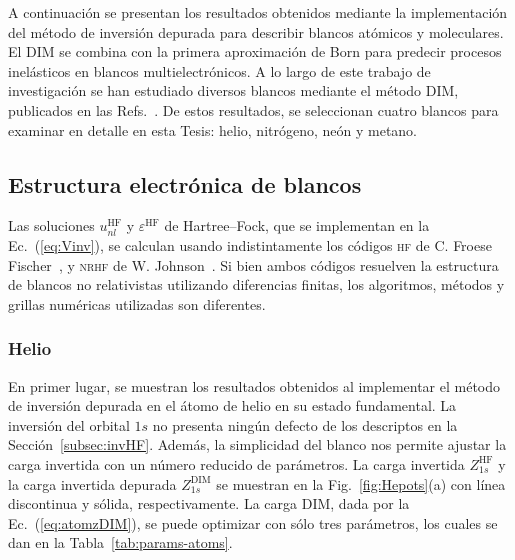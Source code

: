 A continuación se presentan los resultados obtenidos mediante la 
implementación del método de inversión depurada para describir blancos
atómicos y moleculares. El DIM se combina con la primera aproximación de 
Born para predecir procesos inelásticos en blancos multielectrónicos. 
A lo largo de este trabajo de investigación se han estudiado diversos 
blancos mediante el método DIM, publicados en las Refs.~\cite{Mendez:16,
Mendez:19dim,Mendez:18}. De estos resultados, se seleccionan cuatro 
blancos para examinar en detalle en esta Tesis: helio, nitrógeno, neón 
y metano.

\subsection{Estructura electrónica de blancos}
\label{subsec:dimtarget}

Las soluciones $u_{nl}^{\mathrm{HF}}$ y $\varepsilon^{\mathrm{HF}}$ de 
Hartree--Fock, que se implementan en la Ec.~(\ref{eq:Vinv}), se calculan 
usando indistintamente los códigos \textsc{hf} de C. Froese 
Fischer~\cite{FroeseFischer:97}, y \textsc{nrhf} de W. 
Johnson~\cite{Johnson:07}. Si bien ambos códigos resuelven la estructura
de blancos no relativistas utilizando diferencias finitas, los 
algoritmos, métodos y grillas numéricas utilizadas son diferentes. 

\subsubsection{Helio}

En primer lugar, se muestran los resultados obtenidos al implementar
el método de inversión depurada en el átomo de helio en su estado
fundamental. La inversión del orbital $1s$ no presenta ningún defecto
de los descriptos en la Sección~\ref{subsec:invHF}. Además, la 
simplicidad del blanco nos permite ajustar la carga invertida con un 
número reducido de parámetros. La carga invertida $Z_{1s}^{\mathrm{HF}}$ 
y la carga invertida depurada $Z_{1s}^{\mathrm{DIM}}$ se muestran en la 
Fig.~\ref{fig:Hepots}(a) con línea discontinua y sólida, 
respectivamente. La carga DIM, dada por la Ec.~(\ref{eq:atomzDIM}), 
se puede optimizar con sólo tres parámetros, los cuales se dan en la 
Tabla~\ref{tab:params-atoms}. 

